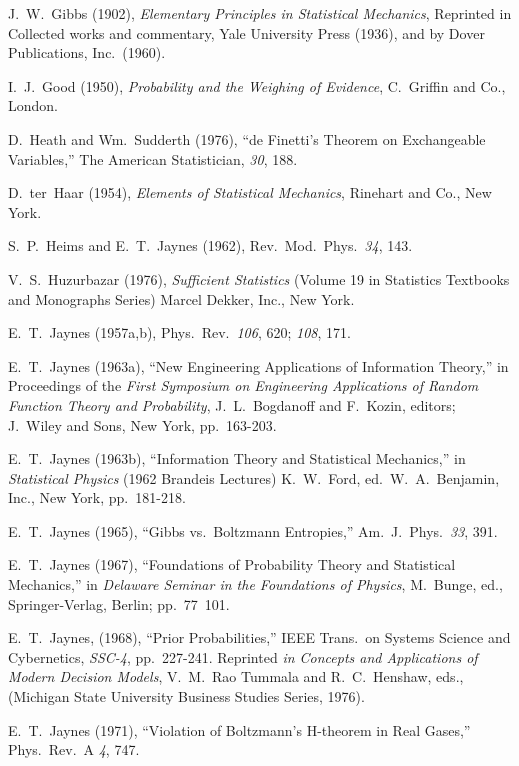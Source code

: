 \begin{itemize}[label={}, leftmargin=*, itemsep={0.5\baselineskip plus 2pt}]
 J.~W.~Gibbs (1902), \emph{Elementary Principles in Statistical Mechanics}, Reprinted in Collected works and commentary, Yale University Press (1936), and by Dover Publications, Inc.~(1960).

 I.~J.~Good (1950), \emph{Probability and the Weighing of Evidence}, C.~Griffin and Co., London.

 D.~Heath and Wm.~Sudderth (1976), ``de Finetti's Theorem on Exchangeable Variables,'' The American Statistician, \emph{30}, 188.

 D.~ter~Haar (1954), \emph{Elements of Statistical Mechanics}, Rinehart and Co., New York.

 S.~P.~Heims and E.~T.~Jaynes (1962), Rev.~Mod.~Phys.~\emph{34}, 143.

 V.~S.~Huzurbazar (1976), \emph{Sufficient Statistics} (Volume 19 in Statistics Textbooks and Monographs Series) Marcel Dekker, Inc., New York.

 E.~T.~Jaynes (1957a,b), Phys.~Rev.~\emph{106}, 620; \emph{108}, 171.

 E.~T.~Jaynes (1963a), ``New Engineering Applications of Information Theory,'' in Proceedings of the \emph{First Symposium on Engineering Applications of Random Function Theory and Probability}, J.~L.~Bogdanoff and F.~Kozin, editors; J.~Wiley and Sons, New York, pp.~163-203.

 E.~T.~Jaynes (1963b), ``Information Theory and Statistical Mechanics,'' in \emph{Statistical Physics} (1962 Brandeis Lectures) K.~W.~Ford, ed.~W.~A.~Benjamin, Inc., New York, pp.~181-218.

 E.~T.~Jaynes (1965), ``Gibbs vs.~Boltzmann Entropies,'' Am.~J.~Phys.~\emph{33}, 391.

 E.~T.~Jaynes (1967), ``Foundations of Probability Theory and Statistical Mechanics,'' in \emph{Delaware Seminar in the Foundations of Physics}, M.~Bunge, ed., Springer-Verlag, Berlin; pp.~77~101.

 E.~T.~Jaynes, (1968), ``Prior Probabilities,'' IEEE Trans.~on Systems Science and Cybernetics, \emph{SSC-4}, pp.~227-241. Reprinted \emph{in Concepts and Applications of Modern Decision Models}, V.~M.~Rao Tummala and R.~C.~Henshaw, eds., (Michigan State University Business Studies Series, 1976).

 E.~T.~Jaynes (1971), ``Violation of Boltzmann's H-theorem in Real Gases,'' Phys.~Rev.~A \emph{4}, 747.


\end{itemize}
